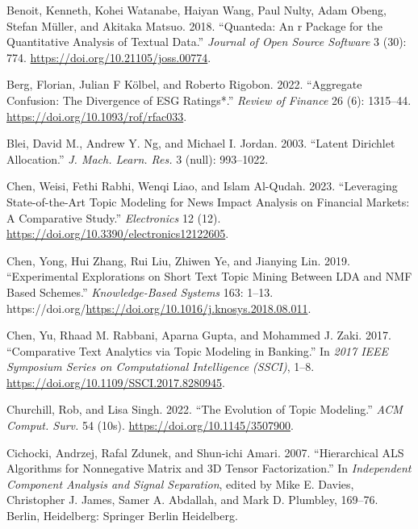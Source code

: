\documentclass[
]{article}
\newlength{\cslhangindent}
\newlength{\cslentryspacingunit} %
\newenvironment{CSLReferences}[2] %
 {%
  \setlength{\parindent}{0pt}
  \ifodd #1
  \let\oldpar\par
  \def\par{\hangindent=\cslhangindent\oldpar}
  \fi
  \setlength{\parskip}{#2\cslentryspacingunit}
 }%
 {}
\begin{document}
\hypertarget{refs}{}
\begin{CSLReferences}{1}{0}
\leavevmode{}%
Benoit, Kenneth, Kohei Watanabe, Haiyan Wang, Paul Nulty, Adam Obeng, Stefan Müller, and Akitaka Matsuo. 2018. {``Quanteda: An r Package for the Quantitative Analysis of Textual Data.''} \emph{Journal of Open Source Software} 3 (30): 774. \url{https://doi.org/10.21105/joss.00774}.

\leavevmode{}%
Berg, Florian, Julian F Kölbel, and Roberto Rigobon. 2022. {``{Aggregate Confusion: The Divergence of ESG Ratings*}.''} \emph{Review of Finance} 26 (6): 1315--44. \url{https://doi.org/10.1093/rof/rfac033}.

\leavevmode{}%
Blei, David M., Andrew Y. Ng, and Michael I. Jordan. 2003. {``Latent Dirichlet Allocation.''} \emph{J. Mach. Learn. Res.} 3 (null): 993--1022.

\leavevmode{}%
Chen, Weisi, Fethi Rabhi, Wenqi Liao, and Islam Al-Qudah. 2023. {``Leveraging State-of-the-Art Topic Modeling for News Impact Analysis on Financial Markets: A Comparative Study.''} \emph{Electronics} 12 (12). \url{https://doi.org/10.3390/electronics12122605}.

\leavevmode{}%
Chen, Yong, Hui Zhang, Rui Liu, Zhiwen Ye, and Jianying Lin. 2019. {``Experimental Explorations on Short Text Topic Mining Between LDA and NMF Based Schemes.''} \emph{Knowledge-Based Systems} 163: 1--13. https://doi.org/\url{https://doi.org/10.1016/j.knosys.2018.08.011}.

\leavevmode{}%
Chen, Yu, Rhaad M. Rabbani, Aparna Gupta, and Mohammed J. Zaki. 2017. {``Comparative Text Analytics via Topic Modeling in Banking.''} In \emph{2017 IEEE Symposium Series on Computational Intelligence (SSCI)}, 1--8. \url{https://doi.org/10.1109/SSCI.2017.8280945}.

\leavevmode{}%
Churchill, Rob, and Lisa Singh. 2022. {``The Evolution of Topic Modeling.''} \emph{ACM Comput. Surv.} 54 (10s). \url{https://doi.org/10.1145/3507900}.

\leavevmode{}%
Cichocki, Andrzej, Rafal Zdunek, and Shun-ichi Amari. 2007. {``Hierarchical ALS Algorithms for Nonnegative Matrix and 3D Tensor Factorization.''} In \emph{Independent Component Analysis and Signal Separation}, edited by Mike E. Davies, Christopher J. James, Samer A. Abdallah, and Mark D. Plumbley, 169--76. Berlin, Heidelberg: Springer Berlin Heidelberg.


\end{CSLReferences}
\end{document}
